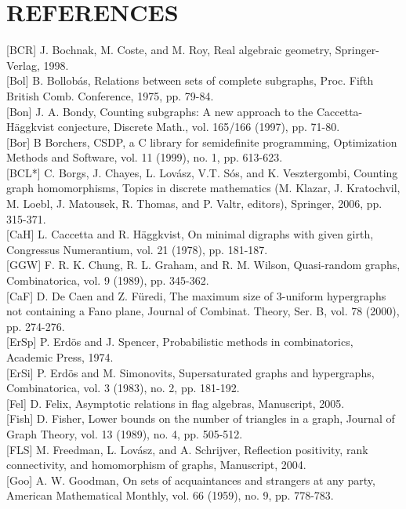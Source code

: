 \documentclass[10pt]{article}
\begin{document}
\section*{REFERENCES}
[BCR] J. Bochnak, M. Coste, and M. Roy, Real algebraic geometry, Springer-Verlag, 1998.\\[0pt]
[Bol] B. Bollobás, Relations between sets of complete subgraphs, Proc. Fifth British Comb. Conference, 1975, pp. 79-84.\\[0pt]
[Bon] J. A. Bondy, Counting subgraphs: A new approach to the Caccetta-Häggkvist conjecture, Discrete Math., vol. 165/166 (1997), pp. 71-80.\\[0pt]
[Bor] B Borchers, CSDP, a C library for semidefinite programming, Optimization Methods and Software, vol. 11 (1999), no. 1, pp. 613-623.\\[0pt]
[BCL*] C. Borgs, J. Chayes, L. Lovász, V.T. Sós, and K. Vesztergombi, Counting graph homomorphisms, Topics in discrete mathematics (M. Klazar, J. Kratochvil, M. Loebl, J. Matousek, R. Thomas, and P. Valtr, editors), Springer, 2006, pp. 315-371.\\[0pt]
[CaH] L. Caccetta and R. Häggkvist, On minimal digraphs with given girth, Congressus Numerantium, vol. 21 (1978), pp. 181-187.\\[0pt]
[GGW] F. R. K. Chung, R. L. Graham, and R. M. Wilson, Quasi-random graphs, Combinatorica, vol. 9 (1989), pp. 345-362.\\[0pt]
[CaF] D. De Caen and Z. Füredi, The maximum size of 3-uniform hypergraphs not containing a Fano plane, Journal of Combinat. Theory, Ser. B, vol. 78 (2000), pp. 274-276.\\[0pt]
[ErSp] P. Erdös and J. Spencer, Probabilistic methods in combinatorics, Academic Press, 1974.\\[0pt]
[ErSi] P. Erdös and M. Simonovits, Supersaturated graphs and hypergraphs, Combinatorica, vol. 3 (1983), no. 2, pp. 181-192.\\[0pt]
[Fel] D. Felix, Asymptotic relations in flag algebras, Manuscript, 2005.\\[0pt]
[Fish] D. Fisher, Lower bounds on the number of triangles in a graph, Journal of Graph Theory, vol. 13 (1989), no. 4, pp. 505-512.\\[0pt]
[FLS] M. Freedman, L. Lovász, and A. Schrijver, Reflection positivity, rank connectivity, and homomorphism of graphs, Manuscript, 2004.\\[0pt]
[Goo] A. W. Goodman, On sets of acquaintances and strangers at any party, American Mathematical Monthly, vol. 66 (1959), no. 9, pp. 778-783.\\[0pt]
\end{document}

